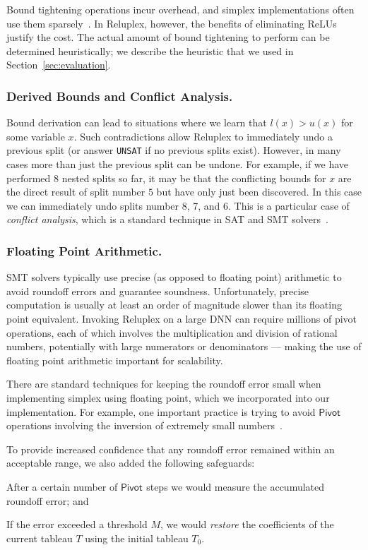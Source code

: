 \documentclass[a4paper]{llncs}
\newcommand{\ub}{u}
\newcommand{\lb}{l}
\newcommand{\unsat}{\texttt{UNSAT}}
\newcommand{\irulename}[2]{\ensuremath{\mathsf{#1}_{#2}}\xspace}
\newcommand{\pivot}[1]{\irulename{Pivot}{#1}}
\begin{document}
Bound tightening operations incur overhead, and simplex
implementations often use them sparsely~\cite{Ki14}. In Reluplex,
however, the benefits of eliminating ReLUs justify the cost. 
The actual amount of bound tightening to perform can be determined
heuristically; we describe the heuristic that we used in Section~\ref{sec:evaluation}.

\subsubsection{Derived Bounds and Conflict Analysis.}
Bound derivation can
lead to situations where we learn that
$\lb{}(x)>\ub{}(x)$
for some variable $x$. Such contradictions allow Reluplex
to immediately undo a previous split (or answer \unsat{} if
no previous splits exist).
However, in many cases more than just the previous split can be undone.
For example, if we have performed $8$ nested splits so far, 
it may be that the conflicting bounds for $x$ are the direct result of split
number $5$ but have only just been discovered.
 In this case we can immediately undo splits number 8, 7, and 6. This
 is a particular case of 
\emph{conflict analysis}, which is a 
standard technique in SAT and SMT solvers~\cite{MaSa99}.

\subsubsection{Floating Point Arithmetic.}

SMT solvers typically use precise (as opposed to floating point) arithmetic 
to avoid roundoff errors and guarantee soundness.
Unfortunately, precise computation is usually at least an order of
magnitude slower than its floating point equivalent.
%
Invoking Reluplex on a large DNN can require millions of 
pivot operations, each of which involves the multiplication
and division of rational numbers, potentially with large numerators or denominators --- making the use of floating point arithmetic
important for scalability.

There are standard techniques for keeping the
roundoff error small when implementing simplex using floating point,
which we incorporated into our implementation.
For example, one important practice is trying to avoid \pivot{} operations
involving the inversion of extremely small numbers~\cite{Va96}. 

 To provide increased confidence that any roundoff error remained
within an acceptable range,
we also added the following safeguards:
  \begin{inparaenum}[(i)]
\item After a certain number of \pivot{} steps we would measure the
   accumulated roundoff error; and
\item If the error exceeded a threshold $M$, we would \emph{restore} the coefficients of
  the current tableau $T$ using the initial tableau $T_0$.
\end{inparaenum}
\end{document}
